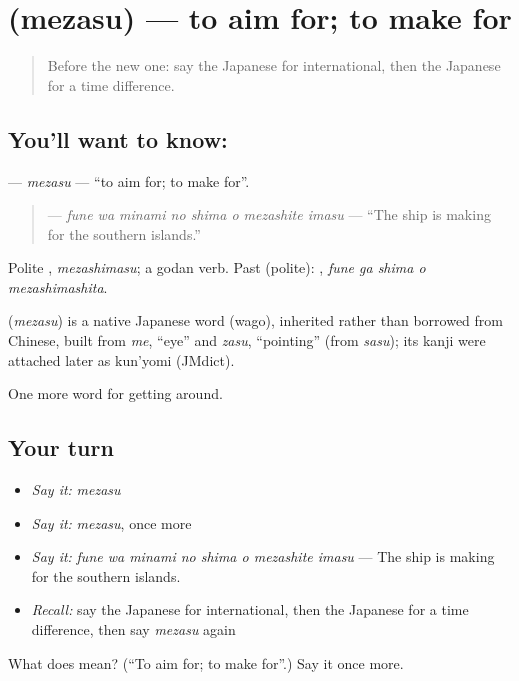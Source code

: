 \section[\texorpdfstring{\ja{めざす} (mezasu)}{めざす (mezasu)}]{ (mezasu) — to aim for; to make for}

\label{lesson:JA-C385-mezasu}



\begin{quote}
Before the new one: say the Japanese for international, then the Japanese for a time difference.
\end{quote}

\subsection*{You'll want to know: }
\textbf{} — \emph{mezasu} — \textquotedblleft{}to aim for; to make for\textquotedblright{}.

\begin{quote}
\textbf{   } — \emph{fune wa minami no shima o mezashite imasu} — \textquotedblleft{}The ship is making for the southern islands.\textquotedblright{}
\end{quote}

Polite \textbf{}, \emph{mezashimasu}; a godan verb. Past (polite): \textbf{  }, \emph{fune ga shima o mezashimashita}.

\begin{cousinweb}
\textbf{} (\emph{mezasu}) is a native Japanese word (wago), inherited rather than borrowed from Chinese, built from \emph{me}, \textquotedblleft{}eye\textquotedblright{} and \emph{zasu}, \textquotedblleft{}pointing\textquotedblright{} (from \emph{sasu}); its kanji were attached later as kun'yomi (JMdict).
\end{cousinweb}

\begin{grammarlens}[title={What you've built}]
One more word for getting around.
\end{grammarlens}

\subsection*{Your turn}
\begin{itemize}
\raggedright
  \item \emph{Say it:} \emph{mezasu}
  \item \emph{Say it:} \emph{mezasu}, once more
  \item \emph{Say it:} \emph{fune wa minami no shima o mezashite imasu} — The ship is making for the southern islands.
  \item \emph{Recall:} say the Japanese for international, then the Japanese for a time difference, then say \emph{mezasu} again
\end{itemize}

\begin{tcolorbox}[breakable,colback=teal!4,colframe=teal!35!black,title={Before you move on}]
What does  mean? (\textquotedblleft{}To aim for; to make for\textquotedblright{}.) Say it once more.
\end{tcolorbox}
